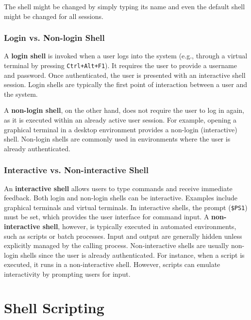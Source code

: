 \begin{tipsblock}
    The shell might be changed by simply typing its name and even the default shell might be changed for all sessions.
\end{tipsblock}

\subsubsection{Login vs. Non-login Shell}

A \textbf{login shell} is invoked when a user logs into the system (e.g., through a virtual terminal by pressing \texttt{Ctrl+Alt+F1}). It requires the user to provide a username and password. Once authenticated, the user is presented with an interactive shell session. Login shells are typically the first point of interaction between a user and the system.

A \textbf{non-login shell}, on the other hand, does not require the user to log in again, as it is executed within an already active user session. For example, opening a graphical terminal in a desktop environment provides a non-login (interactive) shell. Non-login shells are commonly used in environments where the user is already authenticated.

\subsubsection{Interactive vs. Non-interactive Shell}

An \textbf{interactive shell} allows users to type commands and receive immediate feedback. Both login and non-login shells can be interactive. Examples include graphical terminals and virtual terminals. In interactive shells, the prompt (\texttt{\$PS1}) must be set, which provides the user interface for command input.
A \textbf{non-interactive shell}, however, is typically executed in automated environments, such as scripts or batch processes. Input and output are generally hidden unless explicitly managed by the calling process. Non-interactive shells are usually non-login shells since the user is already authenticated. For instance, when a script is executed, it runs in a non-interactive shell. However, scripts can emulate interactivity by prompting users for input.

\section{Shell Scripting}

